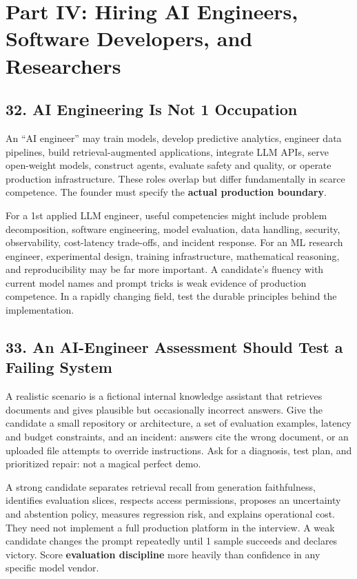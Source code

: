 \section*{Part IV: Hiring AI Engineers, Software Developers, and Researchers}

\subsection*{32. AI Engineering Is Not 1 Occupation}

An ``AI engineer'' may train models, develop predictive analytics, engineer data pipelines, build retrieval-augmented applications, integrate LLM APIs, serve open-weight models, construct agents, evaluate safety and quality, or operate production infrastructure. These roles overlap but differ fundamentally in scarce competence. The founder must specify the \textbf{actual production boundary}.

For a 1st applied LLM engineer, useful competencies might include problem decomposition, software engineering, model evaluation, data handling, security, observability, cost-latency trade-offs, and incident response. For an ML research engineer, experimental design, training infrastructure, mathematical reasoning, and reproducibility may be far more important. A candidate's fluency with current model names and prompt tricks is weak evidence of production competence. In a rapidly changing field, test the durable principles behind the implementation.

\subsection*{33. An AI-Engineer Assessment Should Test a Failing System}

A realistic scenario is a fictional internal knowledge assistant that retrieves documents and gives plausible but occasionally incorrect answers. Give the candidate a small repository or architecture, a set of evaluation examples, latency and budget constraints, and an incident: answers cite the wrong document, or an uploaded file attempts to override instructions. Ask for a diagnosis, test plan, and prioritized repair: not a magical perfect demo.

A strong candidate separates retrieval recall from generation faithfulness, identifies evaluation slices, respects access permissions, proposes an uncertainty and abstention policy, measures regression risk, and explains operational cost. They need not implement a full production platform in the interview. A weak candidate changes the prompt repeatedly until 1 sample succeeds and declares victory. Score \textbf{evaluation discipline} more heavily than confidence in any specific model vendor.

